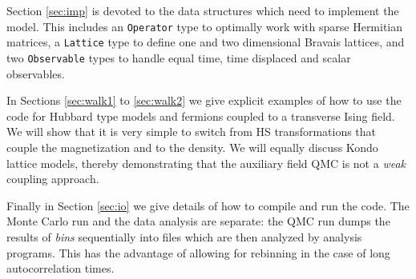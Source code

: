 	   Section \ref{sec:imp} is devoted to the data structures which  need to implement the model.  This includes  an \texttt{Operator} type to  optimally work with sparse Hermitian matrices, a \texttt{Lattice} type  to define one and two dimensional Bravais lattices, and   two   \texttt{Observable} types to handle equal time, time displaced and scalar observables. 
	   
	   In Sections \ref{sec:walk1}  to \ref{sec:walk2}  we give explicit examples of how to use the code for  Hubbard type models and fermions coupled to a transverse Ising field. We will show that it is very simple  to switch from HS transformations that couple the magnetization and to the density.  We will equally discuss Kondo lattice models,  thereby demonstrating that the auxiliary field QMC is  not a {\it weak } coupling approach. 
	   
	   Finally in Section \ref{sec:io} we give details of how to compile and  run the code.   The Monte Carlo run and the  data analysis  are separate: the QMC run  dumps the results of {\it bins}  sequentially into files  which are then analyzed by  analysis programs. This has the advantage of allowing   for rebinning  in the case of long autocorrelation times. 
		
				


